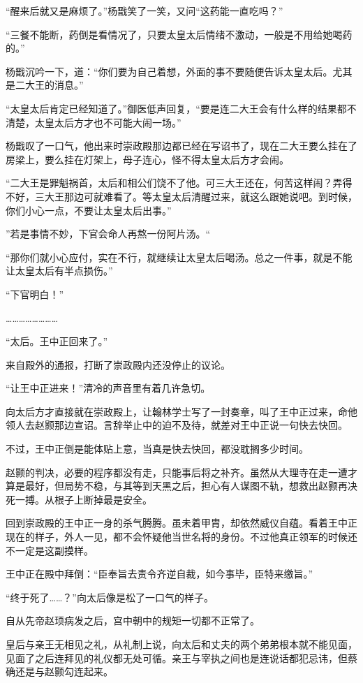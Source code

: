 “醒来后就又是麻烦了。”杨戬笑了一笑，又问“这药能一直吃吗？”

“三餐不能断，药倒是看情况了，只要太皇太后情绪不激动，一般是不用给她喝药的。”

杨戬沉吟一下，道：“你们要为自己着想，外面的事不要随便告诉太皇太后。尤其是二大王的消息。”

“太皇太后肯定已经知道了。”御医低声回复，“要是连二大王会有什么样的结果都不清楚，太皇太后方才也不可能大闹一场。”

杨戬叹了一口气，他出来时崇政殿那边都已经在写诏书了，现在二大王要么挂在了房梁上，要么挂在灯架上，母子连心，怪不得太皇太后方才会闹。

“二大王是罪魁祸首，太后和相公们饶不了他。可三大王还在，何苦这样闹？弄得不好，三大王那边可就难看了。等太皇太后清醒过来，就这么跟她说吧。到时候，你们小心一点，不要让太皇太后出事。”

”若是事情不妙，下官会命人再熬一份阿片汤。“

“那你们就小心应付，实在不行，就继续让太皇太后喝汤。总之一件事，就是不能让太皇太后有半点损伤。”

“下官明白！”

……………………

“太后。王中正回来了。”

来自殿外的通报，打断了崇政殿内还没停止的议论。

“让王中正进来！”清冷的声音里有着几许急切。

向太后方才直接就在崇政殿上，让翰林学士写了一封奏章，叫了王中正过来，命他领人去赵颢那边宣诏。言辞举止中的迫不及待，就差对王中正说一句快去快回。

不过，王中正倒是能体贴上意，当真是快去快回，都没耽搁多少时间。

赵颢的判决，必要的程序都没有走，只能事后将之补齐。虽然从大理寺在走一遭才算是最好，但局势不稳，与其等到天黑之后，担心有人谋图不轨，想救出赵颢再决死一搏。从根子上断掉最是安全。

回到崇政殿的王中正一身的杀气腾腾。虽未着甲胄，却依然威仪自蕴。看着王中正现在的样子，外人一见，都不会怀疑他当世名将的身份。不过他真正领军的时候还不一定是这副摸样。

王中正在殿中拜倒：“臣奉旨去责令齐逆自裁，如今事毕，臣特来缴旨。”

“终于死了……？”向太后像是松了一口气的样子。

自从先帝赵顼病发之后，宫中朝中的规矩一切都不正常了。

皇后与亲王无相见之礼，从礼制上说，向太后和丈夫的两个弟弟根本就不能见面，见面了之后连拜见的礼仪都无处可循。亲王与宰执之间也是连说话都犯忌讳，但蔡确还是与赵颢勾连起来。


